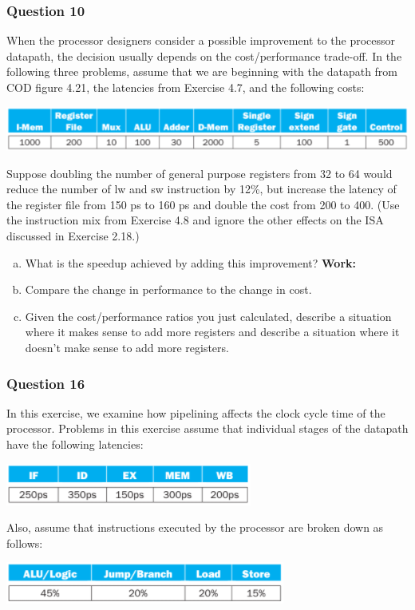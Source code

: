 \documentclass[11pt]{article}
\begin{document}
\setcounter{subsubsection}{9}
\subsubsection{Question 10}
When the processor designers consider a possible improvement to the processor datapath, the decision usually depends on the cost/performance trade-off. In the following three problems, assume that we are beginning with the datapath from COD figure 4.21, the latencies from Exercise 4.7, and the following costs:
\begin{center}\includegraphics[scale=0.6]{q10_image}\\\end{center}
Suppose doubling the number of general purpose registers from 32 to 64 would reduce the number of lw and sw instruction by 12\%, but increase the latency of the register file from 150 ps to 160 ps and double the cost from 200 to 400. (Use the instruction mix from Exercise 4.8 and ignore the other effects on the ISA discussed in Exercise 2.18.)

\begin{enumerate}[(a)]
    \item What is the speedup achieved by adding this improvement?
    \textbf{Work:}
        
    \item Compare the change in performance to the change in cost.
    \item Given the cost/performance ratios you just calculated, describe a situation where it makes sense to add more registers and describe a situation where it doesn't make sense to add more registers.
\end{enumerate}


\setcounter{subsubsection}{15}
\subsubsection{Question 16}
In this exercise, we examine how pipelining affects the clock cycle time of the processor. Problems in this exercise assume that individual stages of the datapath have the following latencies:
\begin{center}\includegraphics[scale=0.68]{q16_image1}\\\end{center}
Also, assume that instructions executed by the processor are broken down as follows:
\begin{center}\includegraphics[scale=0.6]{q16_image2}\\\end{center}
\end{document}
